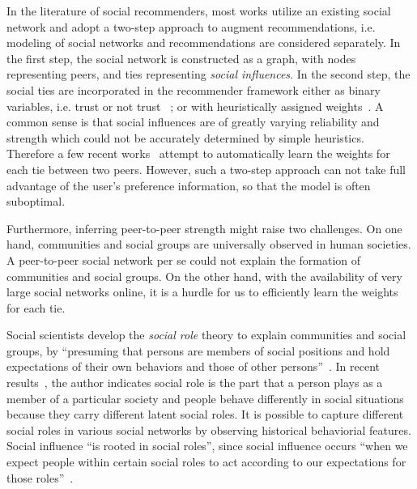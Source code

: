 \documentclass{ieeeaccess}
\begin{document}
In the literature of social recommenders, most works utilize an existing social network and adopt a two-step approach to augment recommendations, i.e. modeling of social networks and recommendations are considered separately. In the first step, the social network is constructed as a graph, with nodes representing peers, and ties representing \textit{social influences}.   In the second step, the social ties are incorporated in the recommender framework either as binary variables, i.e. trust or not trust~\cite{ma2008sorec,ma2009learning,Jamali2010matrix,Yang2013Social,Krohn-Grimberghe2012Multi,Forsati2014Matrix,Forsati2015PushTrust} ; or with heuristically assigned weights~\cite{Ma2009Learninga,Ma2011Recommender,Yao2014Modeling}.  A common sense is that social influences are of greatly varying reliability and strength which could not be accurately determined by simple heuristics. Therefore a few recent works~\cite{AuYeung2011Strength,Jamali2011Generalized} attempt to automatically learn the weights for each tie between two peers. However, such a two-step approach can not take full advantage of the user's preference information, so that the model is often suboptimal.

Furthermore, inferring peer-to-peer strength might raise two challenges. On one hand, communities and social groups are universally observed in human societies. A peer-to-peer social network per se could not explain the  formation of communities and social groups. On the other hand, with the availability of very large social networks online, it is a hurdle for us to efficiently learn the weights for each tie.

Social scientists develop the \textit{social role} theory to explain communities and social groups, by ``presuming that persons are members of social positions and hold expectations of their own behaviors and those of other persons''~\cite{Biddle1986Recent}. In recent results~\cite{Zhao2013Inferring}, the author indicates social role is the part that a person plays as a member of a particular society and people behave differently in social situations because they carry different latent social roles. It is possible to capture different social roles in various
social networks by observing historical behaviorial features. Social influence ``is rooted in social roles'', since social influence occurs ``when we expect people within certain social roles to act according to our expectations for those roles''~\cite{Duff2012THINK}.
\end{document}
